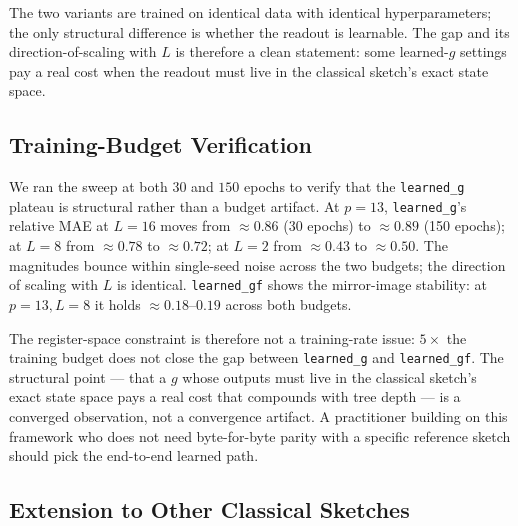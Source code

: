 The two variants are trained on identical data with identical
hyperparameters; the only structural difference is whether the readout
is learnable. The gap and its direction-of-scaling with $L$ is therefore
a clean statement: some learned-$g$ settings pay a real cost when the
readout must live in the classical sketch's exact state space.

\subsection{Training-Budget Verification}

We ran the sweep at both $30$ and $150$ epochs to verify that the
\texttt{learned\_g} plateau is structural rather than a budget artifact.
At $p=13$, \texttt{learned\_g}'s relative MAE at $L=16$ moves from
$\approx 0.86$ (30 epochs) to $\approx 0.89$ (150 epochs); at $L=8$ from
$\approx 0.78$ to $\approx 0.72$; at $L=2$ from $\approx 0.43$ to
$\approx 0.50$. The magnitudes bounce within single-seed noise across
the two budgets; the direction of scaling with $L$ is identical.
\texttt{learned\_gf} shows the mirror-image stability: at $p=13, L=8$ it
holds $\approx 0.18$--$0.19$ across both budgets.

The register-space constraint is therefore not a training-rate issue:
$5\times$ the training budget does not close the gap between
\texttt{learned\_g} and \texttt{learned\_gf}. The structural point ---
that a $g$ whose outputs must live in the classical sketch's exact state
space pays a real cost that compounds with tree depth --- is a
converged observation, not a convergence artifact. A practitioner
building on this framework who does not need byte-for-byte parity with
a specific reference sketch should pick the end-to-end learned path.

\subsection{Extension to Other Classical Sketches}

